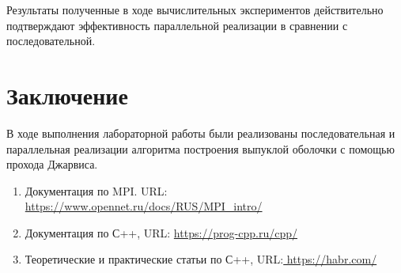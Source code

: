 \documentclass{report}
\begin{document}
\par Результаты полученные в ходе вычислительных экспериментов действительно подтверждают эффективность параллельной реализации в сравнении с последовательной.
\newpage

\section*{Заключение}
В ходе выполнения лабораторной работы были реализованы последовательная и параллельная реализации алгоритма построения выпуклой оболочки с помощью прохода Джарвиса.
\newpage

\begin{enumerate}
\item Документация по MPI. URL: \url{https://www.opennet.ru/docs/RUS/MPI_intro/}
\item Документация по С++, URL: \url{https://prog-cpp.ru/cpp/}
\item Теоретические и практические статьи по С++, URL:\url{ https://habr.com/}
\end{enumerate} 
\newpage

\end{document}
